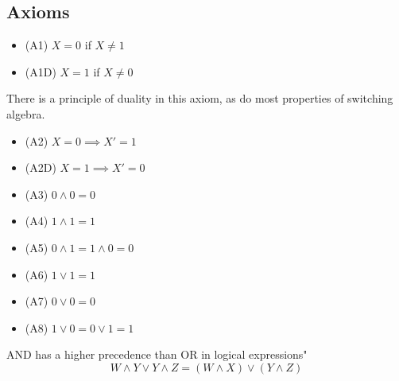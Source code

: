 \documentclass[nobib]{tufte-handout}
\begin{document}
\subsection{Axioms}
\begin{itemize}
    \item (A1) $X=0$ if $X \neq 1$
    \item (A1D) $X=1$ if $X \neq 0$
\end{itemize}
There is a principle of duality in this axiom, as do most properties of switching algebra.\\
\begin{itemize}
    \item (A2) $X=0 \implies X' = 1$
    \item (A2D) $X=1 \implies X'=0$
    \item (A3) $0 \land 0 = 0$
    \item (A4) $1 \land 1 = 1$
    \item (A5) $0\land 1 = 1\land 0 = 0$
    \item (A6) $ 1 \lor 1=1$
    \item (A7) $0\lor 0 = 0$
    \item (A8) $1\lor 0 = 0\lor 1 = 1$
\end{itemize}
AND has a higher precedence than OR in logical expressions"
\begin{equation*}
    W\land Y \lor Y\land Z = (W\land X) \lor (Y\land Z)
\end{equation*}
\end{document}
